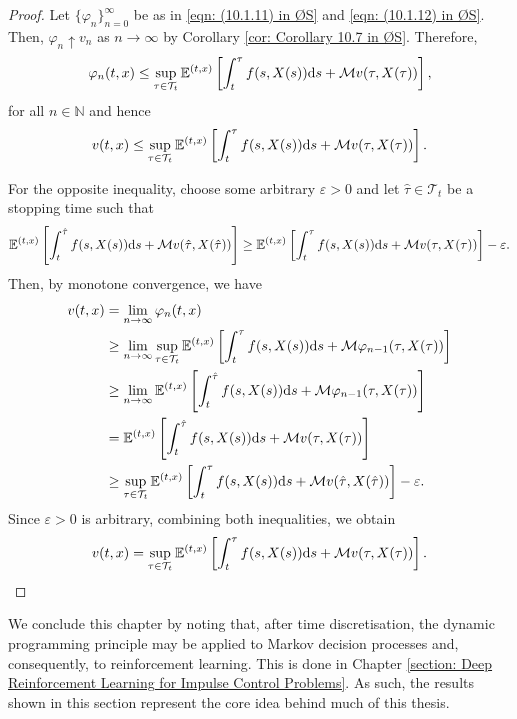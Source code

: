 \begin{proof}
    Let $\{\varphi_n\}_{n=0}^\infty$ be as in \eqref{eqn: (10.1.11) in ØS} and \eqref{eqn: (10.1.12) in ØS}. Then, $\varphi_n \uparrow v_n$ as $n \rightarrow \infty$ by Corollary \ref{cor: Corollary 10.7 in ØS}. Therefore, 
    \begin{equation*}
        \varphi_n(t,x) \leq \sup_{\tau \in \mathcal{T}_t} \mathbb{E}^{(t,x)} \left[ \int_t^\tau f(s,X(s)) \mathrm{d} s + \mathcal{M} v(\tau, X(\tau)) \right],
    \end{equation*}
    for all $n \in \mathbb N$ and hence
    \begin{equation*}
        v(t,x) \leq \sup_{\tau \in \mathcal{T}_t} \mathbb{E}^{(t,x)} \left[ \int_t^\tau f(s,X(s)) \mathrm{d} s + \mathcal{M} v(\tau, X(\tau)) \right].
    \end{equation*}
    
    For the opposite inequality, choose some arbitrary $\varepsilon>0$ and let $\hat{\tau} \in \mathcal{T}_t$ be a stopping time such that
    \begin{align*}
        \mathbb{E}^{(t,x)} \left[ \int_t^{\hat{\tau}} f(s,X(s)) \mathrm{d} s + \mathcal{M} v(\hat{\tau}, X(\hat{\tau}))\right] \geq \mathbb{E}^{(t,x)} \left[ \int_t^\tau f(s,X(s)) \mathrm{d} s + \mathcal{M} v(\tau, X(\tau)) \right] - \varepsilon.
    \end{align*}
    Then, by monotone convergence, we have
    \begin{align*}
        v(t,x) &= \lim_{n \rightarrow \infty} \varphi_n(t,x) \\
        & \geq \lim_{n \rightarrow \infty} \sup_{\tau \in \mathcal{T}_t} \mathbb{E}^{(t,x)} \left[ \int_t^{\tau} f(s,X(s)) \mathrm{d} s + \mathcal{M} \varphi_{n-1}(\tau,X(\tau))\right] \\
        & \geq \lim_{n \rightarrow \infty} \mathbb{E}^{(t,x)} \left[ \int_t^{\hat{\tau}} f(s,X(s)) \mathrm{d} s + \mathcal{M} \varphi_{n-1}(\tau, X(\tau)) \right] \\
        &= \mathbb{E}^{(t,x)} \left[ \int_t^{\hat{\tau}} f(s,X(s)) \mathrm{d} s + \mathcal{M} v(\tau,X(\tau)) \right] \\
        & \geq \sup_{\tau \in \mathcal{T}_t} \mathbb{E}^{(t,x)} \left[ \int_t^\tau f(s,X(s)) \mathrm{d} s + \mathcal{M} v(\hat{\tau},X(\hat{\tau})) \right] - \varepsilon.
    \end{align*}
    Since $\varepsilon>0$ is arbitrary, combining both inequalities, we obtain
    \begin{equation*}
        v(t,x) = \sup_{\tau \in \mathcal{T}_t} \mathbb{E}^{(t,x)} \left[\int_t^\tau f(s,X(s)) \mathrm{d} s + \mathcal{M} v(\tau,X(\tau)) \right].
        \qedhere
    \end{equation*}
\end{proof}

We conclude this chapter by noting that, after time discretisation, the dynamic programming principle may be applied to Markov decision processes and, consequently, to reinforcement learning. This is done in Chapter \ref{section: Deep Reinforcement Learning for Impulse Control Problems}. As such, the results shown in this section represent the core idea behind much of this thesis.
